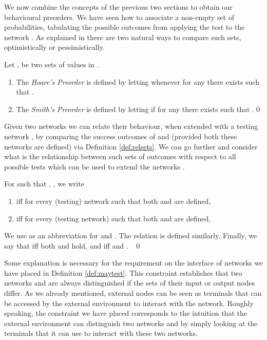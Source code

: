 \documentclass{LMCS}
\begin{document}
We now combine the concepts of the previous two sections to obtain our behavioural preorders.
We have seen how to associate a non-empty set of probabilities, tabulating 
the possible outcomes from applying the test  to the network . 
As explained in \cite{DGHM09full}
there are two natural ways to compare such sets, optimistically or pessimistically. 

\begin{defi}
\label{def:relsets}
Let ,  be two sets of values in 
.
\begin{enumerate}[label=(\roman*)]
\item The \emph{Hoare's Preorder} is defined by letting 
 whenever 
for any  there exists  
such that .
\item The \emph{Smith's Preorder} is defined by letting 
 if 
for any  there exists  
such that .\qed
\end{enumerate}
\end{defi}
\noindent Given two networks  we can relate their behaviour, 
when extended with a testing network , by comparing the success 
outcomes of  and  (provided both these 
networks are defined) via Definition \ref{def:relsets}. 
We can go further and consider what is the relationship between such sets of 
outcomes with respect to all possible tests  which can be used 
to extend the networks .
 
\begin{defi}
\label{def:maytest}
 For  
  such that
  , 
  , we write 
  \begin{enumerate}
  
  \item  iff 
for every (testing) network  such that both 
         and   are defined,
         
  \item  iff for every (testing network)  such that 
  both  and  are defined, 
  
  \end{enumerate}
We use  as an abbreviation for   and 
. The relation  is defined similarly. 
Finally, we say that  iff both  and 
 hold, and  iff  
and .
~\qed
\end{defi}

Some explanation is necessary for the requirement on the interface of networks we have 
placed in Definition \ref{def:maytest}. 
This constraint establishes that two networks  and  are always distinguished 
if the sets of their input or output nodes differ. As we already mentioned, external nodes 
can be seen as terminals that can be accessed by the external environment to interact with 
the network. Roughly speaking, the constraint we have placed corresponds to the intuition 
that the external environment can distinguish two networks 
 and  by simply looking at the terminals that it can use to interact with these 
two networks. 
\end{document}
